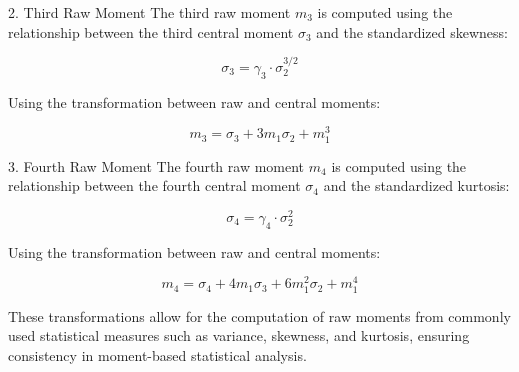 \documentclass{article}
\begin{document}
2. Third Raw Moment
The third raw moment \( m_3 \) is computed using the relationship between the third central moment \( \sigma_3 \) and the standardized skewness:

\[
\sigma_3 = \gamma_3 \cdot \sigma_2^{3/2}
\]

Using the transformation between raw and central moments:

\[
m_3 = \sigma_3 + 3 m_1 \sigma_2 + m_1^3
\]

3. Fourth Raw Moment
The fourth raw moment \( m_4 \) is computed using the relationship between the fourth central moment \( \sigma_4 \) and the standardized kurtosis:

\[
\sigma_4 = \gamma_4 \cdot \sigma_2^2
\]

Using the transformation between raw and central moments:

\[
m_4 = \sigma_4 + 4 m_1 \sigma_3 + 6 m_1^2 \sigma_2 + m_1^4
\]

These transformations allow for the computation of raw moments from commonly used statistical measures such as variance, skewness, and kurtosis, ensuring consistency in moment-based statistical analysis.
\end{document}
